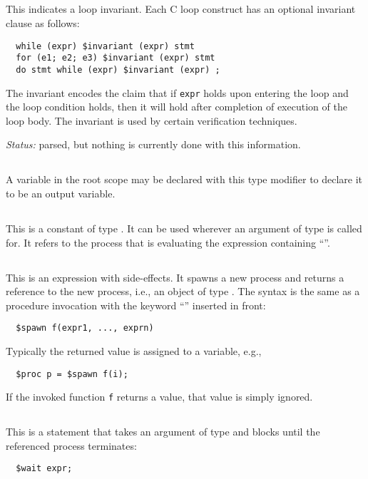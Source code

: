 \documentclass[11pt, oneside, letterpaper]{book}
\begin{document}
\subsection{\cinvariant} This indicates a loop invariant.  Each C loop
construct has an optional invariant clause as follows:
\begin{verbatim}
  while (expr) $invariant (expr) stmt
  for (e1; e2; e3) $invariant (expr) stmt
  do stmt while (expr) $invariant (expr) ;
\end{verbatim}
The invariant encodes the claim that if \texttt{expr} holds upon
entering the loop and the loop condition holds, then it will hold
after completion of execution of the loop body.  The invariant is used
by certain verification techniques.

\emph{Status:} parsed, but nothing is currently done with this
information.

\subsection{\coutput} A variable in the root scope may be declared
with this type modifier to declare it to be an output variable.

\subsection{\cself} This is a constant of type \cproc.  It can be used
wherever an argument of type \cproc{} is called for.  It refers to the
process that is evaluating the expression containing ``\cself''.

\subsection{\cspawn} This is an expression with side-effects.  It
spawns a new process and returns a reference to the new process, i.e.,
an object of type \cproc.  The syntax is the same as a procedure
invocation with the keyword ``\cspawn'' inserted in front:
\begin{verbatim}
  $spawn f(expr1, ..., exprn)
\end{verbatim}
Typically the returned value is assigned to a variable, e.g.,
\begin{verbatim}
  $proc p = $spawn f(i);
\end{verbatim}
If the invoked function \texttt{f} returns a value, that value is
simply ignored.

\subsection{\cwait} This is a statement that takes an argument of type
\cproc{} and blocks until the referenced process terminates:
\begin{verbatim}
  $wait expr;
\end{verbatim}
\end{document}
